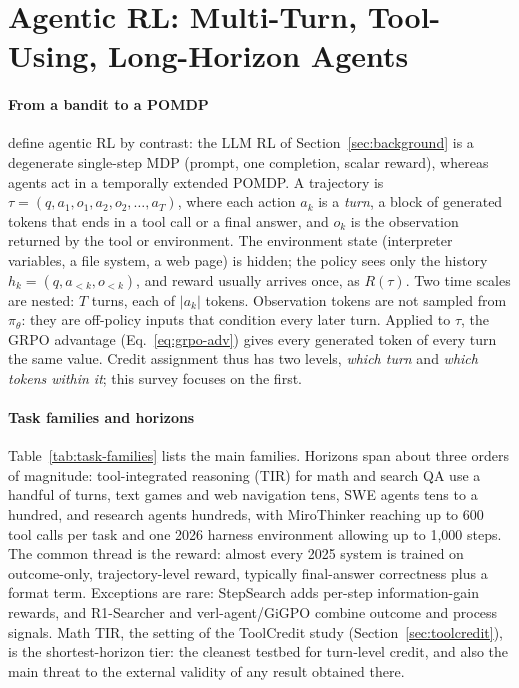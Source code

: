\section{Agentic RL: Multi-Turn, Tool-Using, Long-Horizon Agents}\label{sec:agentic}

\paragraph{From a bandit to a POMDP}
\citet{zhang2025landscape} define agentic RL by contrast: the LLM RL of Section~\ref{sec:background} is a degenerate single-step MDP (prompt, one completion, scalar reward), whereas agents act in a temporally extended POMDP. A trajectory is $\tau=(q,a_1,o_1,a_2,o_2,\dots,a_T)$, where each action $a_k$ is a \emph{turn}, \ie a block of generated tokens that ends in a tool call or a final answer, and $o_k$ is the observation returned by the tool or environment. The environment state (interpreter variables, a file system, a web page) is hidden; the policy sees only the history $h_k=(q,a_{<k},o_{<k})$, and reward usually arrives once, as $R(\tau)$. Two time scales are nested: $T$ turns, each of $|a_k|$ tokens. Observation tokens are not sampled from $\pi_\theta$: they are off-policy inputs that condition every later turn. Applied to $\tau$, the GRPO advantage (Eq.~\ref{eq:grpo-adv}) gives every generated token of every turn the same value. Credit assignment thus has two levels, \emph{which turn} and \emph{which tokens within it}; this survey focuses on the first.

\paragraph{Task families and horizons}
Table~\ref{tab:task-families} lists the main families. Horizons span about three orders of magnitude: tool-integrated reasoning (TIR) for math and search QA use a handful of turns, text games and web navigation tens, SWE agents tens to a hundred, and research agents hundreds, with MiroThinker reaching up to 600 tool calls per task \citep{miromind2025mirothinker} and one 2026 harness environment allowing up to 1{,}000 steps\unverified. The common thread is the reward: almost every 2025 system is trained on outcome-only, trajectory-level reward, typically final-answer correctness plus a format term. Exceptions are rare: StepSearch \citep{wang2025stepsearch} adds per-step information-gain rewards\unverified, and R1-Searcher \citep{song2025r1} and verl-agent/GiGPO \citep{feng2025group} combine outcome and process signals. Math TIR, the setting of the ToolCredit study (Section~\ref{sec:toolcredit}), is the shortest-horizon tier: the cleanest testbed for turn-level credit, and also the main threat to the external validity of any result obtained there.

